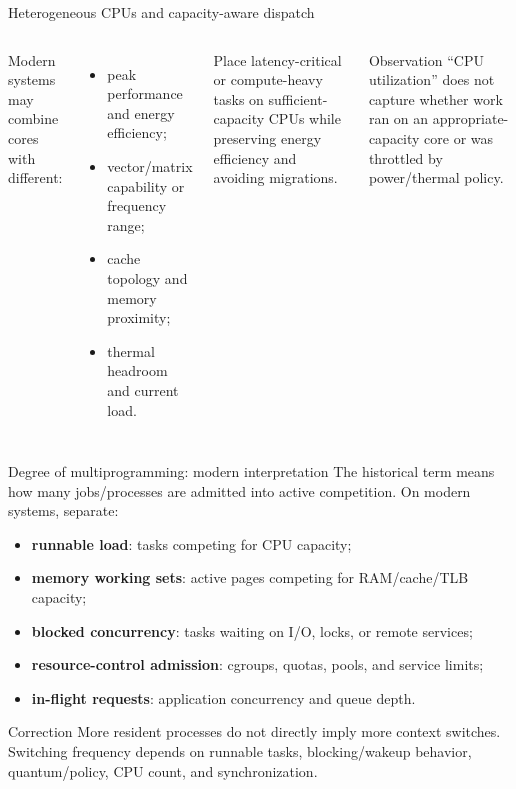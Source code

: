 \documentclass[aspectratio=169,11pt]{beamer}
\newcommand{\concept}[1]{\textcolor{osblue}{\textbf{#1}}}
\begin{document}
\begin{frame}{Heterogeneous CPUs and capacity-aware dispatch}
  \begin{columns}[T,onlytextwidth]
      Modern systems may combine cores with different:
      \begin{itemize}
        \item peak performance and energy efficiency;
        \item vector/matrix capability or frequency range;
        \item cache topology and memory proximity;
        \item thermal headroom and current load.
      \end{itemize}
      \begin{tcolorbox}[title=Policy problem]
        Place latency-critical or compute-heavy tasks on sufficient-capacity CPUs while preserving energy efficiency and avoiding migrations.
      \end{tcolorbox}
      \begin{alertblock}{Observation}
        ``CPU utilization'' does not capture whether work ran on an appropriate-capacity core or was throttled by power/thermal policy.
      \end{alertblock}
  \end{columns}
\end{frame}

\begin{frame}{Degree of multiprogramming: modern interpretation}
  The historical term means how many jobs/processes are admitted into active competition. On modern systems, separate:
  \begin{itemize}
    \item \concept{runnable load}: tasks competing for CPU capacity;
    \item \concept{memory working sets}: active pages competing for RAM/cache/TLB capacity;
    \item \concept{blocked concurrency}: tasks waiting on I/O, locks, or remote services;
    \item \concept{resource-control admission}: cgroups, quotas, pools, and service limits;
    \item \concept{in-flight requests}: application concurrency and queue depth.
  \end{itemize}
  \begin{alertblock}{Correction}
    More resident processes do not directly imply more context switches. Switching frequency depends on runnable tasks, blocking/wakeup behavior, quantum/policy, CPU count, and synchronization.
  \end{alertblock}
\end{frame}
\end{document}
